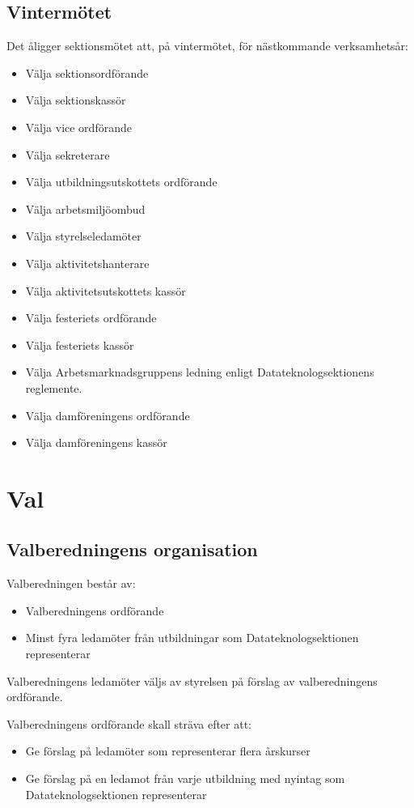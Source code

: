 \documentclass{datateknologsektionen-document}
\begin{document}
\subsection{Vintermötet}
Det åligger sektionsmötet att, på vintermötet, för nästkommande verksamhetsår:
\begin{itemize}
  \item Välja sektionsordförande
  \item Välja sektionskassör
  \item Välja vice ordförande
  \item Välja sekreterare
  \item Välja utbildningsutskottets ordförande
  \item Välja arbetsmiljöombud
  \item Välja styrelseledamöter
  \item Välja aktivitetshanterare
  \item Välja aktivitetsutskottets kassör
  \item Välja festeriets ordförande
  \item Välja festeriets kassör
  \item Välja Arbetsmarknadsgruppens ledning enligt Datateknologsektionens reglemente.
  \item Välja damföreningens ordförande
  \item Välja damföreningens kassör
\end{itemize}

\section{Val}
\subsection{Valberedningens organisation}
Valberedningen består av:
\begin{itemize}
  \item Valberedningens ordförande
  \item Minst fyra ledamöter från utbildningar som Datateknologsektionen representerar
\end{itemize}

Valberedningens ledamöter väljs av styrelsen på förslag av valberedningens ordförande.

Valberedningens ordförande skall sträva efter att:
\begin{itemize}
  \item Ge förslag på ledamöter som representerar flera årskurser
  \item Ge förslag på en ledamot från varje utbildning med nyintag som Datateknologsektionen representerar
\end{itemize}
\end{document}
